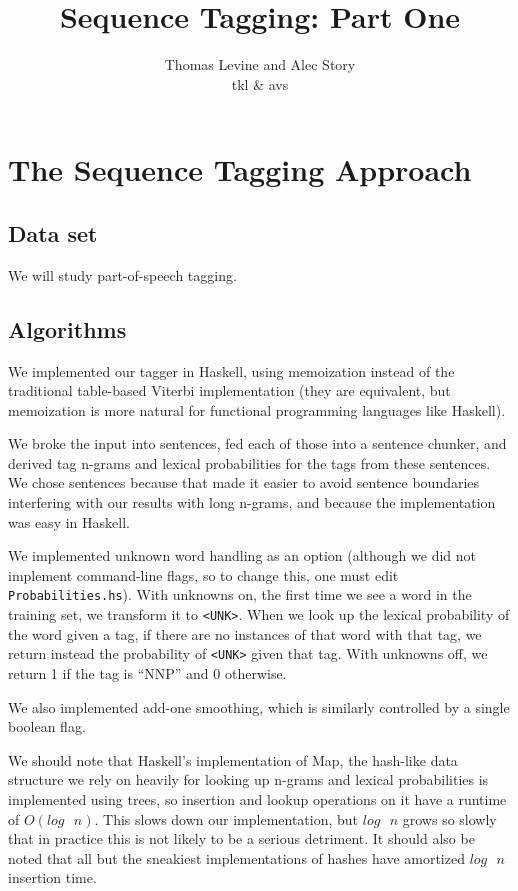 \documentclass{article}
\title{Sequence Tagging: Part One}
\author{Thomas Levine and Alec Story\\\small{tkl\osn{22} \& avs\osn{38}}}
\begin{document}
\maketitle

\section{The Sequence Tagging Approach}

\subsection{Data set}
We will study part-of-speech tagging.
\subsection{Algorithms}

We implemented our tagger in Haskell, using memoization instead of the
traditional table-based Viterbi implementation (they are equivalent, but
memoization is more natural for functional programming languages like Haskell).

We broke the input into sentences, fed each of those into a sentence chunker,
and derived tag n-grams and lexical probabilities for the tags from these
sentences.  We chose sentences because that made it easier to avoid sentence
boundaries interfering with our results with long n-grams, and because the
implementation was easy in Haskell.

We implemented unknown word handling as an option (although we did not implement
command-line flags, so to change this, one must edit \verb+Probabilities.hs+).
With unknowns on, the first time we see a word in the training set, we transform
it to \verb+<UNK>+.  When we look up the lexical probability of the word given a
tag, if there are no instances of that word with that tag, we return instead the
probability of \verb+<UNK>+ given that tag.  With unknowns off, we return 1 if
the tag is ``NNP'' and 0 otherwise.

We also implemented add-one smoothing, which is similarly controlled by a single
boolean flag.

We should note that Haskell's implementation of Map, the hash-like data
structure we rely on heavily for looking up n-grams and lexical probabilities is
implemented using trees, so insertion and lookup operations on it have a runtime
of $O(log\text{ } n)$.  This slows down our implementation, but $log\text{ } n$ grows so slowly
that in practice this is not likely to be a serious detriment.  It should also
be noted that all but the sneakiest implementations of hashes have amortized
$log\text{ } n$  insertion time.
\end{document}
